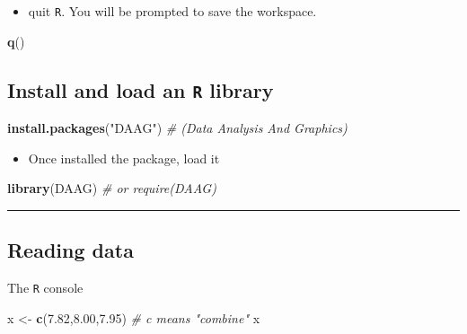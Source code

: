 \documentclass[]{article}
\def\tightlist{}
\newenvironment{Shaded}{\begin{snugshade}}{\end{snugshade}}
\newcommand{\KeywordTok}[1]{\textcolor[rgb]{0.13,0.29,0.53}{\textbf{{#1}}}}
\newcommand{\FloatTok}[1]{\textcolor[rgb]{0.00,0.00,0.81}{{#1}}}
\newcommand{\StringTok}[1]{\textcolor[rgb]{0.31,0.60,0.02}{{#1}}}
\newcommand{\CommentTok}[1]{\textcolor[rgb]{0.56,0.35,0.01}{\textit{{#1}}}}
\newcommand{\NormalTok}[1]{{#1}}
\numberwithin{equation}{section}
\begin{document}
\begin{itemize}
\tightlist
\item
  quit \texttt{R}. You will be prompted to save the workspace.
\end{itemize}

\begin{Shaded}
\begin{Highlighting}[]
\KeywordTok{q}\NormalTok{()}
\end{Highlighting}
\end{Shaded}

\subsection{\texorpdfstring{Install and load an \texttt{R}
library}{Install and load an R library}}\label{install-and-load-an-r-library}

\begin{Shaded}
\begin{Highlighting}[]
\KeywordTok{install.packages}\NormalTok{(}\StringTok{"DAAG"}\NormalTok{) }\CommentTok{# (Data Analysis And Graphics)}
\end{Highlighting}
\end{Shaded}

\begin{itemize}
\tightlist
\item
  Once installed the package, load it
\end{itemize}

\begin{Shaded}
\begin{Highlighting}[]
\KeywordTok{library}\NormalTok{(DAAG) }\CommentTok{# or require(DAAG)}
\end{Highlighting}
\end{Shaded}

\begin{center}\rule{0.5\linewidth}{\linethickness}\end{center}

\subsection{Reading data}\label{reading-data}

The \texttt{R} console

\begin{Shaded}
\begin{Highlighting}[]
\NormalTok{x <-}\StringTok{ }\KeywordTok{c}\NormalTok{(}\FloatTok{7.82}\NormalTok{,}\FloatTok{8.00}\NormalTok{,}\FloatTok{7.95}\NormalTok{) }\CommentTok{# c means "combine"}
\NormalTok{x}
\end{Highlighting}
\end{Shaded}
\end{document}
